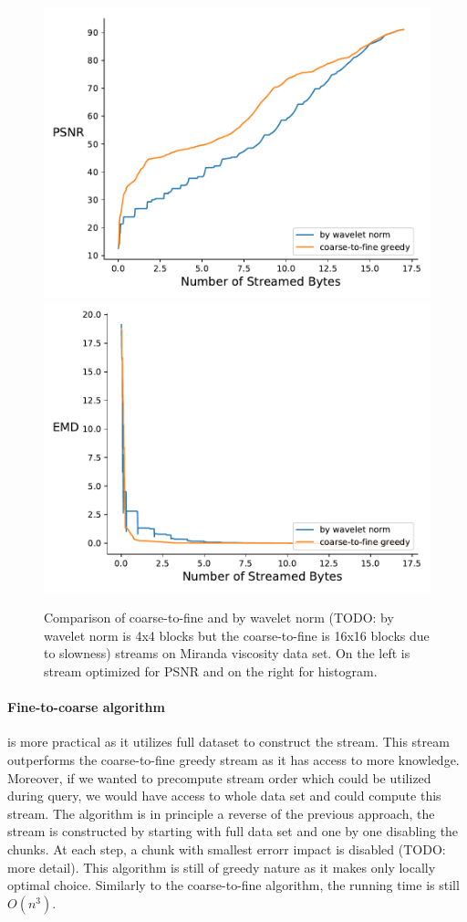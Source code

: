 \begin{figure}
        \centering
        \includegraphics[width=0.48\linewidth]{img/figure4/rmse-miranda-viscosity}
        \includegraphics[width=0.48\linewidth]{img/figure4/histogram-miranda-viscosity}
        \caption{Comparison of coarse-to-fine and by wavelet norm (TODO: by wavelet norm is 4x4 blocks but the coarse-to-fine is 16x16 blocks due to slowness) streams on Miranda viscosity data set.
                 On the left is stream optimized for PSNR and on the right for histogram.}
\end{figure}

\paragraph*{Fine-to-coarse algorithm} is more practical as it utilizes full dataset to construct the stream.
This stream outperforms the coarse-to-fine greedy stream as it has access to more knowledge. Moreover,
if we wanted to precompute stream order which could be utilized during query, we would have access to whole
data set and could compute this stream. The algorithm is in principle a reverse of the previous approach, the
stream is constructed by starting with full data set and one by one disabling the chunks. At each step, a chunk
with smallest errorr impact is disabled (TODO: more detail). This algorithm is still of greedy nature as it
makes only locally optimal choice. Similarly to the coarse-to-fine algorithm, the running time is still $O(n^3)$.

